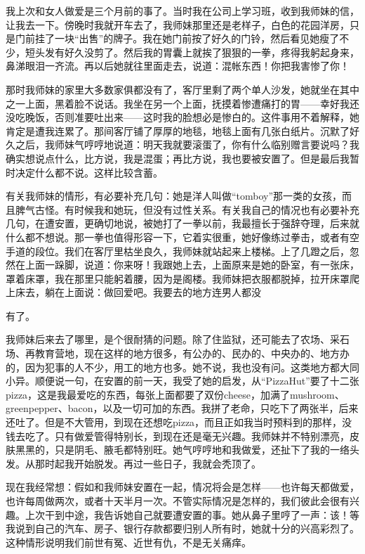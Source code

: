 我上次和女人做爱是三个月前的事了。当时我在公司上学习班，收到我师妹的信，让我去一下。傍晚时我就开车去了，我师妹那里还是老样子，白色的花园洋房，只是门前挂了一块“出售”的牌子。我在她门前按了好久的门铃，然后看见她瘦了不少，短头发有好久没剪了。然后我的胃囊上就挨了狠狠的一拳，疼得我躬起身来，鼻涕眼泪一齐流。再以后她就往里面走去，说道：混帐东西！你把我害惨了你！ 

那时我师妹的家里大多数家俱都没有了，客厅里剩了两个单人沙发，她就坐在其中之一上面，黑着脸不说话。我坐在另一个上面，抚摸着惨遭痛打的胃——幸好我还没吃晚饭，否则准要吐出来——这时我的脸想必是惨白的。这件事用不着解释，她肯定是遭我连累了。那间客厅铺了厚厚的地毯，地毯上面有几张白纸片。沉默了好久之后，我师妹气哼哼地说道：明天我就要滚蛋了，你有什么临别赠言要说吗？我确实想说点什么，比方说，我是混蛋；再比方说，我也要被安置了。但是最后我暂时决定什么都不说。这样比较含蓄。 

有关我师妹的情形，有必要补充几句：她是洋人叫做“tomboy”那一类的女孩，而且脾气古怪。有时候我和她玩，但没有过性关系。有关我自己的情况也有必要补充几句，在遭安置，更确切地说，被她打了一拳以前，我最擅长于强辞夺理，后来就什么都不想说。那一拳也值得形容一下，它着实很重，她好像练过拳击，或者有空手道的段位。我们在客厅里枯坐良久，我师妹就站起来上楼梯。上了几蹬之后，忽然在上面一跺脚，说道：你来呀！我跟她上去，上面原来是她的卧室，有一张床，罩着床罩，我在那里只能躬着腰，因为是阁楼。我师妹把衣服都脱掉，拉开床罩爬上床去，躺在上面说：做回爱吧。我要去的地方连男人都没 

有了。 

我师妹后来去了哪里，是个很耐猜的问题。除了住监狱，还可能去了农场、采石场、再教育营地，现在这样的地方很多，有公办的、民办的、中央办的、地方办的，因为犯事的人不少，用工的地方也多。她不说，我也没有问。这类地方都大同小异。顺便说一句，在安置的前一天，我受了她的启发，从“PizzaHut”要了十二张pizza，这是我最爱吃的东西，每张上面都要了双份cheese，加满了mushroom、greenpepper、bacon，以及一切可加的东西。我拼了老命，只吃下了两张半，后来还吐了。但是不大管用，到现在还想吃pizza，而且正如我当时预料到的那样，没钱去吃了。只有做爱管得特别长，到现在还是毫无兴趣。我师妹并不特别漂亮，皮肤黑黑的，只是阴毛、腋毛都特别旺。她气哼哼地和我做爱，还扯下了我的一络头发。从那时起我开始脱发。再过一些日子，我就会秃顶了。 

现在我经常想：假如和我师妹安置在一起，情况将会是怎样——也许每天都做爱，也许每周做两次，或者十天半月一次。不管实际情况是怎样的，我们彼此会很有兴趣。上次干到中途，我告诉她自己就要遭安置的事。她从鼻子里哼了一声：该！等我说到自己的汽车、房子、银行存款都要归别人所有时，她就十分的兴高彩烈了。这种情形说明我们前世有冤、近世有仇，不是无关痛痒。 

